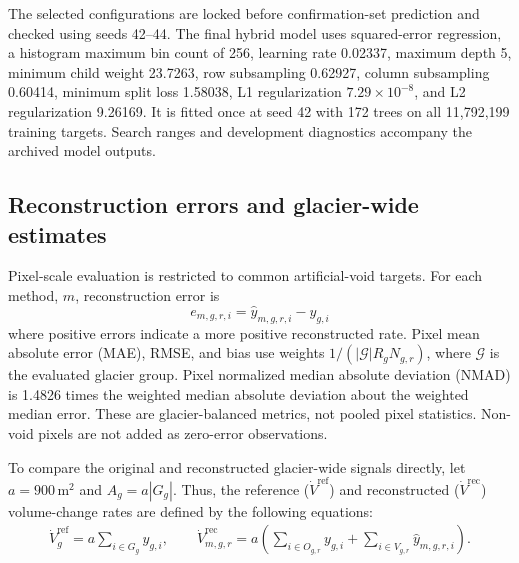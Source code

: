 \documentclass[tc,manuscript]{copernicus}
\begin{document}
The selected configurations are locked before confirmation-set prediction and checked using seeds 42--44. The final hybrid model uses squared-error regression, a histogram maximum bin count of 256, learning rate 0.02337, maximum depth 5, minimum child weight 23.7263, row subsampling 0.62927, column subsampling 0.60414, minimum split loss 1.58038, L1 regularization $7.29\times10^{-8}$, and L2 regularization 9.26169. It is fitted once at seed 42 with 172 trees on all 11,792,199 training targets. Search ranges and development diagnostics accompany the archived model outputs.

\subsection{Reconstruction errors and glacier-wide estimates}
Pixel-scale evaluation is restricted to common artificial-void targets. For each method, $m$, reconstruction error is
\begin{equation}
	e_{m,g,r,i}=\widehat y_{m,g,r,i}-y_{g,i}
\end{equation}
where positive errors indicate a more positive reconstructed rate. Pixel mean absolute error (MAE), RMSE, and bias use weights $1/(|\mathcal G|R_gN_{g,r})$, where $\mathcal G$ is the evaluated glacier group. Pixel normalized median absolute deviation (NMAD) is 1.4826 times the weighted median absolute deviation about the weighted median error. These are glacier-balanced metrics, not pooled pixel statistics. Non-void pixels are not added as zero-error observations.

To compare the original and reconstructed glacier-wide signals directly, let $a=900\,\mathrm{m^2}$ and $A_g=a|G_g|$. Thus, the reference ($\dot V^{\mathrm{ref}}$) and reconstructed ($\dot V^{\mathrm{rec}}$) volume-change rates are defined by the following equations:
\begin{align}
\dot V_g^{\mathrm{ref}}=a\sum_{i\in G_g}y_{g,i}, \qquad
\dot V_{m,g,r}^{\mathrm{rec}}=a\left(\sum_{i\in O_{g,r}}y_{g,i}+\sum_{i\in V_{g,r}}\widehat y_{m,g,r,i}\right).
\end{align}
\end{document}
